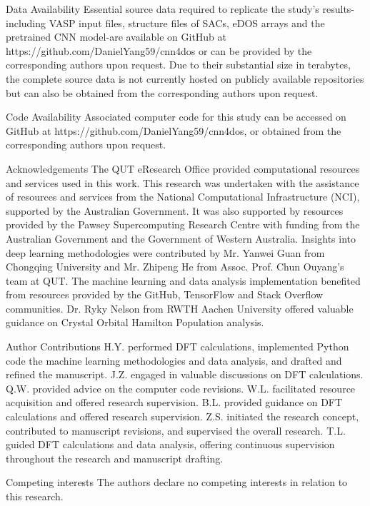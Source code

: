 Data Availability
Essential source data required to replicate the study's results-including VASP input files,
structure files of SACs, eDOS arrays and the pretrained CNN model-are available on GitHub
at https://github.com/DanielYang59/cnn4dos or can be provided by the corresponding authors upon request.
Due to their substantial size in terabytes, the complete source data is not currently hosted on publicly available repositories but can also be obtained from the corresponding authors upon request.


Code Availability
Associated computer code for this study can be accessed on GitHub at https://github.com/DanielYang59/cnn4dos,
 or obtained from the corresponding authors upon request.


Acknowledgements
The QUT eResearch Office provided computational resources and services used in this work.
This research was undertaken with the assistance of resources and services from the National Computational Infrastructure (NCI), supported by the Australian Government.
It was also supported by resources provided by the Pawsey Supercomputing Research Centre with funding from the Australian Government and the Government of Western Australia.
Insights into deep learning methodologies were contributed by Mr. Yanwei Guan from Chongqing University and Mr. Zhipeng He from Assoc. Prof. Chun Ouyang's team at QUT.
The machine learning and data analysis implementation benefited from resources provided by the GitHub, TensorFlow and Stack Overflow communities.
Dr. Ryky Nelson from RWTH Aachen University offered valuable guidance on Crystal Orbital Hamilton Population analysis.


Author Contributions
H.Y. performed DFT calculations, implemented Python code the machine learning methodologies and data analysis, and drafted and refined the manuscript.
J.Z. engaged in valuable discussions on DFT calculations.
Q.W. provided advice on the computer code revisions.
W.L. facilitated resource acquisition and offered research supervision.
B.L. provided guidance on DFT calculations and offered research supervision.
Z.S. initiated the research concept, contributed to manuscript revisions, and supervised the overall research.
T.L. guided DFT calculations and data analysis, offering continuous supervision throughout the research and manuscript drafting.


Competing interests
The authors declare no competing interests in relation to this research.
